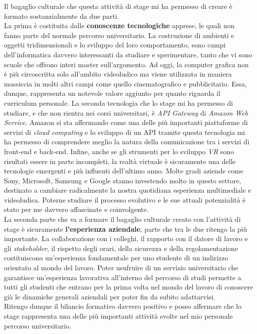 Il bagaglio culturale che questa attività di stage mi ha permesso di creare è formato sostanzialmente da due parti. \\
La prima è costituita dalle \textbf{conoscenze tecnologiche} apprese, le quali non fanno parte del normale percorso universitario. La costruzione di ambienti e oggetti tridimensionali e lo sviluppo del loro comportamento, sono campi dell'informatica davvero interessanti da studiare e sperimentare, tanto che vi sono scuole che offrono interi master sull'argomento. Ad oggi, la computer grafica non è più circoscritta solo all'ambito videoludico ma viene utilizzata in maniera massiccia in molti altri campi come quello cinematografico e pubblicitario. Essa, dunque, rappresenta un notevole valore aggiunto per quanto riguarda il curriculum personale. La seconda tecnologia che lo stage mi ha permesso di studiare, e che non rientra nei corsi universitari, è \textit{API Gateway} di \textit{Amazon Web Service}. Amazon si sta affermando come una delle più importanti piattaforme di servizi di \textit{cloud computing}\hyperlink{cc}{} e lo sviluppo di un API tramite questa tecnologia mi ha permesso di comprendere meglio la natura della comunicazione tra i servizi di front-end e back-end. Infine, anche se gli strumenti per lo sviluppo \textit{VR} sono risultati essere in parte incompleti, la realtà virtuale è sicuramente una delle tecnologie emergenti e più influenti dell'ultimo anno. Molte gradi aziende come Sony, Microsoft, Samsung e Google stanno investendo molto in questo settore, destinato a cambiare radicalmente la nostra quotidiana esperienza multimediale e videoludica. Poterne studiare il processo evolutivo e le sue attuali potenzialità è stato per me davvero affascinate e coinvolgente. \\
La seconda parte che va a formare il bagaglio culturale creato con l'attività di stage è sicuramente \textbf{l'esperienza aziendale}, parte che tra le due ritengo la più importante. La collaborazione con i colleghi, il rapporto con il datore di lavoro e gli \textit{stakeholder}\hyperlink{sh}{}, il rispetto degli orari, della sicurezza e della regolamentazione costituiscono un'esperienza fondamentale per uno studente di un indirizzo orientato al mondo del lavoro. Poter usufruire di un servizio universitario che garantisce un'esperienza lavorativa all'interno del percorso di studi permette a tutti gli studenti che entrano per la prima volta nel mondo del lavoro di conoscere già le dinamiche generali aziendali per poter fin da subito adattarvisi. \\
Ritengo dunque il bilancio formativo davvero positivo e posso affermare che lo stage rappresenta una delle più importanti attività svolte nel mio personale percorso universitario.

